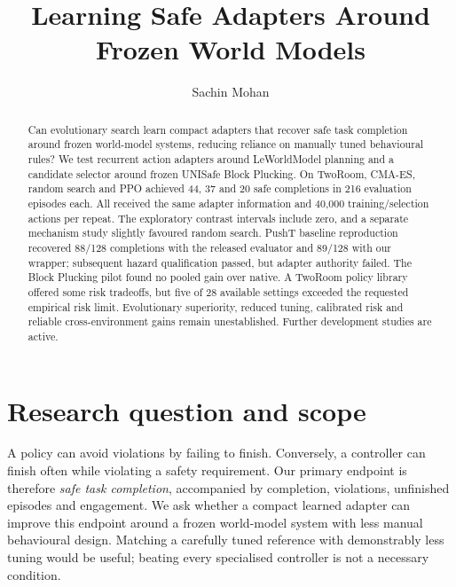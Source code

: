 \documentclass[sigconf,nonacm]{acmart}
\begin{document}
\raggedbottom
\title{Learning Safe Adapters Around Frozen World Models}
\author{Sachin Mohan}
\begin{abstract}
Can evolutionary search learn compact adapters that recover safe task completion
around frozen world-model systems, reducing reliance on manually tuned behavioural
rules? We test recurrent action adapters around LeWorldModel planning and a
candidate selector around frozen UNISafe Block Plucking. On TwoRoom, CMA-ES, random search and PPO achieved
44, 37 and 20 safe completions in 216 evaluation episodes each. All received the
same adapter information and 40,000 training/selection actions per repeat. The
exploratory contrast intervals include zero, and a separate mechanism study slightly
favoured random search. PushT baseline reproduction recovered 88/128 completions
with the released evaluator and 89/128 with our wrapper; subsequent hazard
qualification passed, but adapter authority failed. The Block Plucking pilot found
no pooled gain over native. A TwoRoom policy library offered some risk tradeoffs,
but five of 28 available settings exceeded the requested empirical risk limit.
Evolutionary superiority, reduced tuning, calibrated risk and reliable
cross-environment gains remain unestablished. Further development studies are active.
\end{abstract}
\maketitle

\section{Research question and scope}
A policy can avoid violations by failing to finish. Conversely, a controller can
finish often while violating a safety requirement. Our primary endpoint is therefore
\emph{safe task completion}, accompanied by completion, violations, unfinished
episodes and engagement. We ask whether a compact learned adapter can improve this
endpoint around a frozen world-model system with less manual behavioural design.
Matching a carefully tuned reference with demonstrably less tuning would be useful;
beating every specialised controller is not a necessary condition.
\end{document}
